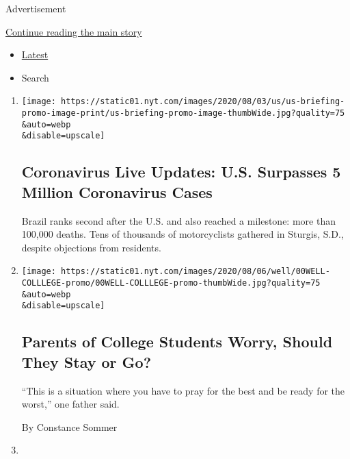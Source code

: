 Advertisement

\protect\hyperlink{after-mid2}{Continue reading the main story}

\begin{itemize}
\tightlist
\item
  \protect\hyperlink{stream-panel}{Latest}
\item
  Search
\end{itemize}

\begin{enumerate}
\def\labelenumi{\arabic{enumi}.}
\item
  \href{/2020/08/08/world/coronavirus-updates.html}{}

  \texttt{[image: https://static01.nyt.com/images/2020/08/03/us/us-briefing-promo-image-print/us-briefing-promo-image-thumbWide.jpg?quality=75\\\&auto=webp\\\&disable=upscale]}

  \hypertarget{coronavirus-live-updates-us-surpasses-5-million-coronavirus-cases}{%
  \subsection{Coronavirus Live Updates: U.S. Surpasses 5 Million
  Coronavirus
  Cases}\label{coronavirus-live-updates-us-surpasses-5-million-coronavirus-cases}}

  Brazil ranks second after the U.S. and also reached a milestone: more
  than 100,000 deaths. Tens of thousands of motorcyclists gathered in
  Sturgis, S.D., despite objections from residents.
\item
  \href{/2020/08/07/well/family/college-students-coronavirus-parents-back-to-school.html}{}

  \texttt{[image: https://static01.nyt.com/images/2020/08/06/well/00WELL-COLLLEGE-promo/00WELL-COLLLEGE-promo-thumbWide.jpg?quality=75\\\&auto=webp\\\&disable=upscale]}

  \hypertarget{parents-of-college-students-worry-should-they-stay-or-go}{%
  \subsection{Parents of College Students Worry, Should They Stay or
  Go?}\label{parents-of-college-students-worry-should-they-stay-or-go}}

  ``This is a situation where you have to pray for the best and be ready
  for the worst,'' one father said.

  By Constance Sommer
\item
  \href{/2020/08/07/us/portsmouth-nh-newsletter-poems.html}{}


\end{enumerate}
